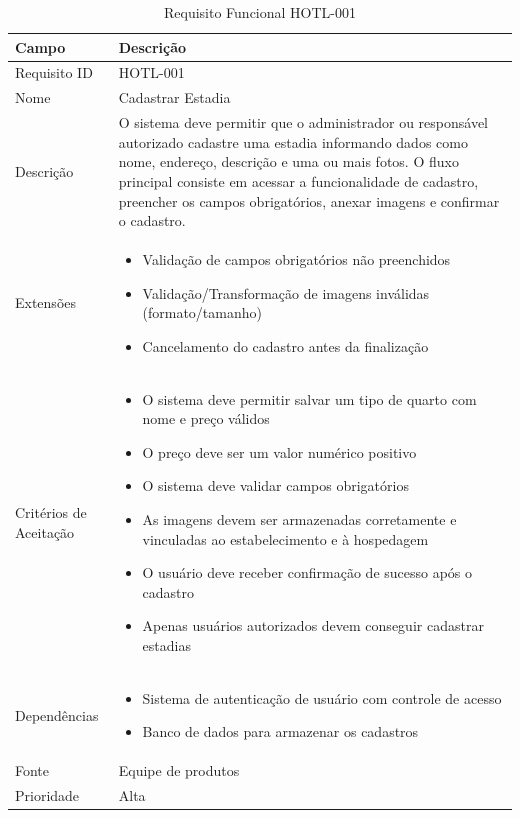 \documentclass[
    12pt,
    oneside,
    a4paper,
    brazil
]{abntex2}
\begin{document}
\begin{table}[h]
	\begin{tabular}{|l|p{10cm}|}
		\hline
		\textbf{Campo} & \textbf{Descrição} \\
		\hline
		Requisito ID & HOTL-001 \\
		\hline
		Nome & Cadastrar Estadia \\
		\hline
		Descrição & O sistema deve permitir que o administrador ou responsável autorizado cadastre uma estadia informando dados como nome, endereço, descrição e uma ou mais fotos. O fluxo principal consiste em acessar a funcionalidade de cadastro, preencher os campos obrigatórios, anexar imagens e confirmar o cadastro. \\
		\hline
		Extensões & \begin{itemize}[leftmargin=*, labelsep=0.5em, noitemsep, topsep=0pt]
		\item Validação de campos obrigatórios não preenchidos
		\item Validação/Transformação de imagens inválidas (formato/tamanho)
		\item Cancelamento do cadastro antes da finalização
		\end{itemize} \\
		\hline
		Critérios de Aceitação & \begin{itemize}[leftmargin=*, labelsep=0.5em, noitemsep, topsep=0pt]
		\item O sistema deve permitir salvar um tipo de quarto com nome e preço válidos
		\item O preço deve ser um valor numérico positivo
		\item O sistema deve validar campos obrigatórios
		\item As imagens devem ser armazenadas corretamente e vinculadas ao estabelecimento e à hospedagem
		\item O usuário deve receber confirmação de sucesso após o cadastro
		\item Apenas usuários autorizados devem conseguir cadastrar estadias
		\end{itemize} \\
		\hline
		Dependências & \begin{itemize}[leftmargin=*, labelsep=0.5em, noitemsep, topsep=0pt] 
		\item Sistema de autenticação de usuário com controle de acesso
		\item Banco de dados para armazenar os cadastros
		\end{itemize} \\
		\hline
		Fonte & Equipe de produtos \\
		\hline
		Prioridade & Alta \\
		\hline
	\end{tabular}
	\caption{Requisito Funcional HOTL-001}
\end{table}
\end{document}
